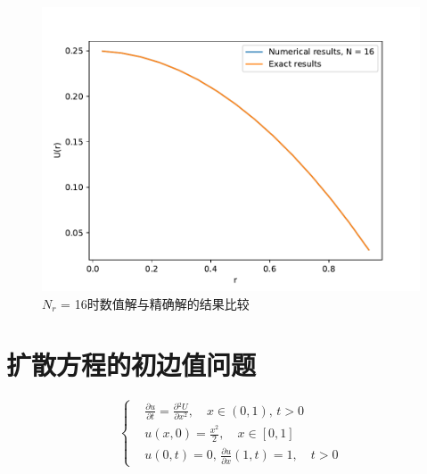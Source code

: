 \documentclass[a4paper,zihao=5,UTF8]{ctexart}
\newcommand{\pdv}[2]{\frac{\partial{#1}}{\partial{#2}}}
\begin{document}
	\begin{figure}[htbp]
		\centering
		\includegraphics[scale=0.7]{1_poisson_Nr_16.pdf}
		\caption{$N_r$ = 16时数值解与精确解的结果比较}
		\label{1 poisson Nr 16}
	\end{figure}

	\section{扩散方程的初边值问题}
	\begin{equation}
		\left\{
			\begin{aligned}
				&\pdv{u}{t} = \pdv{^2U}{x^2},\quad x\in(0, 1),\,t > 0\\
				&u(x, 0) = \frac{x^2}{2}, \quad x\in [0, 1]\\
				&u(0, t) = 0, \, \pdv{u}{x}(1, t) = 1,\quad t > 0
			\end{aligned}
		\right.
	\end{equation}
\end{document}
